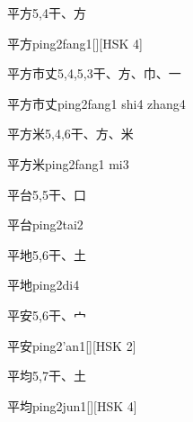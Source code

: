\begin{entry}{平方}{5,4}{⼲、⽅}
  \begin{phonetics}{平方}{ping2fang1}[][HSK 4]
  \end{phonetics}
\end{entry}

\begin{entry}{平方市丈}{5,4,5,3}{⼲、⽅、⼱、⼀}
  \begin{phonetics}{平方市丈}{ping2fang1 shi4 zhang4}
  \end{phonetics}
\end{entry}

\begin{entry}{平方米}{5,4,6}{⼲、⽅、⽶}
  \begin{phonetics}{平方米}{ping2fang1 mi3}
  \end{phonetics}
\end{entry}

\begin{entry}{平台}{5,5}{⼲、⼝}
  \begin{phonetics}{平台}{ping2tai2}
  \end{phonetics}
\end{entry}

\begin{entry}{平地}{5,6}{⼲、⼟}
  \begin{phonetics}{平地}{ping2di4}
  \end{phonetics}
\end{entry}

\begin{entry}{平安}{5,6}{⼲、⼧}
  \begin{phonetics}{平安}{ping2'an1}[][HSK 2]
  \end{phonetics}
\end{entry}

\begin{entry}{平均}{5,7}{⼲、⼟}
  \begin{phonetics}{平均}{ping2jun1}[][HSK 4]
  \end{phonetics}
\end{entry}

